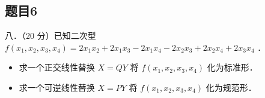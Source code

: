 \documentclass{article}
\begin{document}
\subsection{题目6}
八．（20 分）已知二次型 \(f\left(x_{1}, x_{2}, x_{3}, x_{4}\right)=2 x_{1} x_{2}+2 x_{1} x_{3}-2 x_{1} x_{4}-2 x_{2} x_{3}+2 x_{2} x_{4}+2 x_{3} x_{4}\) ．

\begin{itemize}
  \item[（1）] 求一个正交线性替换 \(X=Q Y\) 将 \(f\left(x_{1}, x_{2}, x_{3}, x_{4}\right)\) 化为标准形．
  \item[（2）] 求一个可逆线性替换 \(X=P Y\) 将 \(f\left(x_{1}, x_{2}, x_{3}, x_{4}\right)\) 化为规范形．
\end{itemize}
\end{document}

